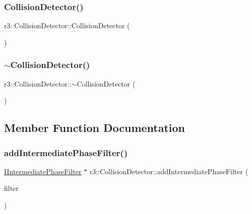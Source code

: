 \subsubsection{\texorpdfstring{Collision\+Detector()}{CollisionDetector()}\hspace{0.1cm}{\footnotesize\ttfamily [2/2]}}
{\footnotesize\ttfamily r3\+::\+Collision\+Detector\+::\+Collision\+Detector (\begin{DoxyParamCaption}\item[{const \mbox{\hyperlink{classr3_1_1_collision_detector}{Collision\+Detector}} \&}]{ }\end{DoxyParamCaption})\hspace{0.3cm}{\ttfamily [delete]}}

\mbox{\label{classr3_1_1_collision_detector_ab45ac57f6ab9bcab367e104e9423722a}} 
\subsubsection{\texorpdfstring{$\sim$\+Collision\+Detector()}{~CollisionDetector()}}
{\footnotesize\ttfamily r3\+::\+Collision\+Detector\+::$\sim$\+Collision\+Detector (\begin{DoxyParamCaption}{ }\end{DoxyParamCaption})}



\subsection{Member Function Documentation}
\mbox{\label{classr3_1_1_collision_detector_a804d66d43502a2b113aa1e8c302cebc7}} 
\subsubsection{\texorpdfstring{add\+Intermediate\+Phase\+Filter()}{addIntermediatePhaseFilter()}}
{\footnotesize\ttfamily \mbox{\hyperlink{classr3_1_1_i_intermediate_phase_filter}{I\+Intermediate\+Phase\+Filter}} $\ast$ r3\+::\+Collision\+Detector\+::add\+Intermediate\+Phase\+Filter (\begin{DoxyParamCaption}\item[{\mbox{\hyperlink{classr3_1_1_collision_detector_a8337c2c23ec77350b65977e043c07827}{Intermediate\+Phase\+Filter\+\_\+\+Ptr}}}]{filter }\end{DoxyParamCaption})}




